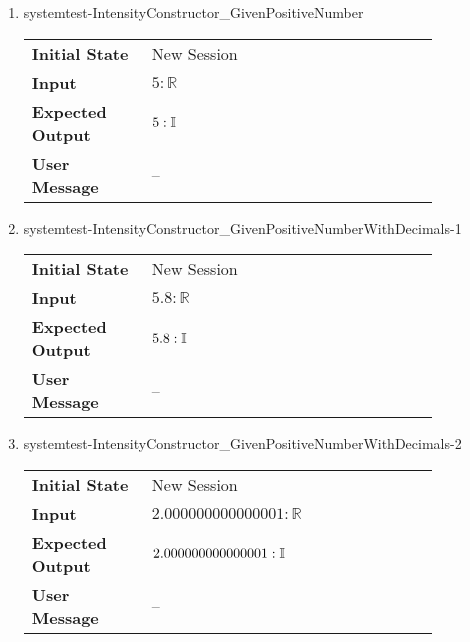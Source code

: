 \begin{enumerate}

    \item{systemtest-IntensityConstructor\_GivenPositiveNumber}
    \begin{table}[H]
        \centering
        \begin{tabular}{P{0.25\linewidth}P{0.6\linewidth}}
            \toprule
            \textbf{Initial State} & New Session \\
            \textbf{Input} & $5 : \mathbb{R}$ \\ \midrule
            \textbf{Expected Output} & $5 : \mathbb{I}$ \\
            \textbf{User Message} & -- \\ \bottomrule
        \end{tabular}
    \end{table}

    \item{systemtest-IntensityConstructor\_GivenPositiveNumberWithDecimals-1}
    \begin{table}[H]
        \centering
        \begin{tabular}{P{0.25\linewidth}P{0.6\linewidth}}
            \toprule
            \textbf{Initial State} & New Session \\
            \textbf{Input} & $5.8 : \mathbb{R}$ \\ \midrule
            \textbf{Expected Output} & $5.8 : \mathbb{I}$ \\
            \textbf{User Message} & -- \\ \bottomrule
        \end{tabular}
    \end{table}

    \clearpage

    \item{systemtest-IntensityConstructor\_GivenPositiveNumberWithDecimals-2}
    \begin{table}[H]
        \centering
        \begin{tabular}{P{0.25\linewidth}P{0.6\linewidth}}
            \toprule
            \textbf{Initial State} & New Session \\
            \textbf{Input} & $2.000000000000001 : \mathbb{R}$ \\ \midrule
            \textbf{Expected Output} & $2.000000000000001 :
            \mathbb{I}$ \\
            \textbf{User Message} & -- \\ \bottomrule
        \end{tabular}
    \end{table}


\end{enumerate}
